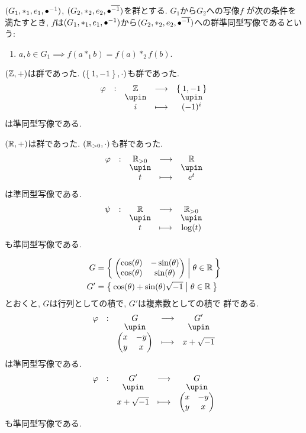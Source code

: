 \begin{definition}
  $(G_1,\ast_1,e_1,{\bullet}^{-1})$,
  $(G_2,\ast_2,e_2,{\bullet}^{\overline{-1}})$を群とする.
  $G_1$から$G_2$への写像$f$
  が次の条件を満たすとき,
  $f$は$(G_1,\ast_1,e_1,{\bullet}^{-1})$から$(G_2,\ast_2,e_2,{\bullet}^{\overline{-1}})$への群準同型写像であるという:
  \begin{enumerate}
  \item $a,b\in G_1 \implies f(a\ast_1 b) = f(a)\ast_2 f(b)$.
  \end{enumerate}
\end{definition}

\begin{example}
  $(\mathbb{Z},+)$は群であった.
  $(\Set{1,-1},\cdot)$も群であった.
  \begin{align*}
    \shazo{\varphi}{\ZZ}{\Set{1,-1}}
    {i}{(-1)^i}
  \end{align*}
  は準同型写像である.
\end{example}

\begin{example}
  $(\mathbb{R},+)$は群であった.
  $(\mathbb{R}_{>0},\cdot)$も群であった.
  \begin{align*}
    \shazo{\varphi}{\RR_{>0}}{\RR}
    {t}{e^t}
  \end{align*}
  は準同型写像である.
  \begin{align*}
    \shazo{\psi}{\RR}{\RR_{>0}}
    {t}{\log(t)}
  \end{align*}
  も準同型写像である.
\end{example}

\begin{example}
  \begin{align*}
    G&=\Set{\begin{pmatrix}\cos(\theta)&-\sin(\theta)\\\cos(\theta)&\sin(\theta)\end{pmatrix}|\theta\in\mathbb{R}}\\
    G'&=\Set{\cos(\theta)+\sin(\theta)\sqrt{-1}|\theta\in\mathbb{R}}
  \end{align*}
  とおくと, $G$は行列としての積で, $G'$は複素数としての積で
  群である.
  \begin{align*}
    \shazo{\varphi}{G}{G'}
    {\begin{pmatrix}x&-y\\y&x\end{pmatrix}}{x+\sqrt{-1}}
  \end{align*}
  は準同型写像である.
  \begin{align*}
    \shazo{\varphi}{G'}{G}
    {x+\sqrt{-1}}{\begin{pmatrix}x&-y\\y&x\end{pmatrix}}
  \end{align*}
  も準同型写像である.
\end{example}

